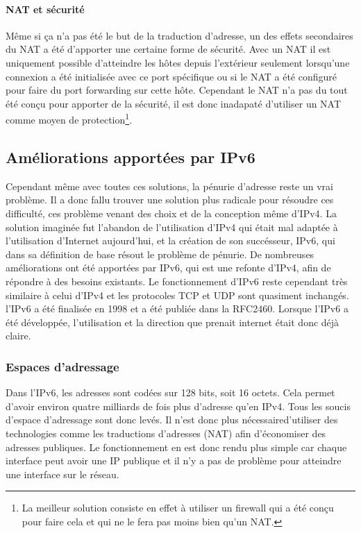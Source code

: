 \paragraph{NAT et sécurité}
Même si ça n'a pas été le but de la traduction d'adresse, un des effets
secondaires du NAT a été d'apporter une certaine forme de sécurité.  Avec un
NAT il est uniquement possible d'atteindre les hôtes depuis l'extérieur
seulement lorsqu'une connexion a été initialisée avec ce port spécifique ou si
le NAT a été configuré pour faire du port forwarding sur cette hôte.  Cependant
le NAT n'a pas du tout été conçu pour apporter de la sécurité, il est donc
inadapaté d'utiliser un NAT comme moyen de protection\footnote{
La meilleur solution consiste en effet à utiliser un firewall qui a été conçu pour faire cela
et qui ne le fera pas moins bien qu'un NAT.}.

\subsection{Améliorations apportées par IPv6}

Cependant même avec toutes ces solutions, la pénurie d'adresse reste un vrai
problème. Il a donc fallu trouver une solution plus radicale pour résoudre ces
difficulté, ces problème venant des choix et de la conception même d'IPv4.  La
solution imaginée fut l'abandon de l'utilisation d'IPv4 qui était mal adaptée à
l'utilisation d'Internet aujourd'hui, et la création de son succésseur, IPv6,
qui dans sa définition de base résout le problème de pénurie.
\smallbreak
De nombreuses améliorations ont été apportées par IPv6, qui est une refonte
d'IPv4, afin de répondre à des besoins existants. Le fonctionnement d'IPv6
reste cependant très similaire à celui d'IPv4 et les protocoles TCP et UDP sont
quasiment inchangés.  l'IPv6 a été finalisée en 1998 et a été publiée dans la
RFC2460. Lorsque l'IPv6 a été développée, l'utilisation et la direction que
prenait internet était donc déjà claire. 

\subsubsection{Espaces d'adressage}
Dans l'IPv6, les adresses sont codées sur 128 bits, soit 16 octets. Cela permet
d'avoir environ quatre milliards de fois plus d'adresse qu'en IPv4. Tous les
soucis d'espace d'adressage sont donc levés. Il n'est donc plus nécessaired'utiliser des technologies comme les traductions d'adresses (NAT) afin
d'économiser des adresses publiques. Le fonctionnement en est donc rendu plus
simple car chaque interface peut avoir une IP publique et il n'y a pas de
problème pour atteindre une interface sur le réseau.

